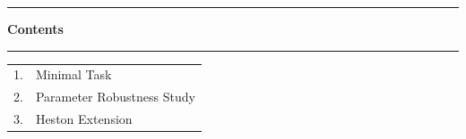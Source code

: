 \begin{frame}[plain]

\centering

\vspace*{0.4cm}


{\color{black!60}\rule{0.82\textwidth}{0.4pt}}

\vspace{0.40cm}

{\rmfamily\bfseries\fontsize{22}{26}\selectfont
Contents}

\vspace{0.40cm}

{\color{black!60}\rule{0.82\textwidth}{0.4pt}}

\vspace{0.9cm}

{\rmfamily\fontsize{17}{21}\selectfont

\begin{tabular}{ll}
1. & Minimal Task \\[0.45cm]
2. & Parameter Robustness Study \\[0.45cm]
3. & Heston Extension
\end{tabular}

}

\vfill



\end{frame}
